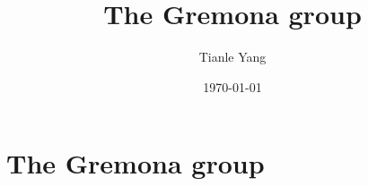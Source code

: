 \documentclass[sectionlevel=section,status=draft]{noteformyself}
\title{The Gremona group}
\author{Tianle Yang}
\date{\today}
\begin{document}
\maketitle

    \section[
      status=draft,
      tag=00000,
      label=\labelNFM{sec:automorphism-and-birational-groups:the-gremona-group}
    ]{The Gremona group}



\end{document}
